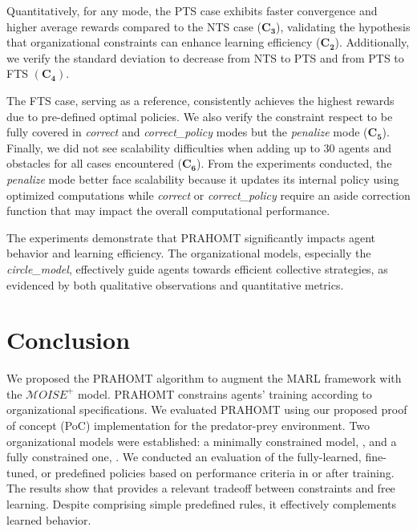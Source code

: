 \documentclass[runningheads]{llncs}
\theoremstyle{freethm}
\theoremstyle{proofoutline}
\newcounter{proof}
\begin{document}
Quantitatively, for any mode, the PTS case exhibits faster convergence and higher average rewards compared to the NTS case ($\mathbf{C_3}$), validating the hypothesis that organizational constraints can enhance learning efficiency ($\mathbf{C_2}$). Additionally, we verify the standard deviation to decrease from NTS to PTS and from PTS to FTS $(\mathbf{C_4})$.

The FTS case, serving as a reference, consistently achieves the highest rewards due to pre-defined optimal policies. We also verify the constraint respect to be fully covered in \textit{correct} and \textit{correct\_policy} modes but the \textit{penalize} mode ($\mathbf{C_5}$). Finally, we did not see scalability difficulties when adding up to 30 agents and obstacles for all cases encountered ($\mathbf{C_6}$). From the experiments conducted, the \textit{penalize} mode better face scalability because it updates its internal policy using optimized computations while \textit{correct} or \textit{correct\_policy} require an aside correction function that may impact the overall computational performance.

The experiments demonstrate that PRAHOMT significantly impacts agent behavior and learning efficiency. The organizational models, especially the \textit{circle\_model}, effectively guide agents towards efficient collective strategies, as evidenced by both qualitative observations and quantitative metrics.


\section{Conclusion}\label{sec:conclusion}

We proposed the PRAHOMT algorithm to augment the MARL framework with the $\mathcal{M}OISE^+$ model. PRAHOMT constrains agents' training according to organizational specifications. We evaluated PRAHOMT using our proposed proof of concept (PoC) implementation for the  predator-prey environment. Two organizational models were established: a minimally constrained model, , and a fully constrained one, . We conducted an evaluation of the fully-learned, fine-tuned, or predefined policies based on performance criteria in or after training.
%
The results show that  provides a relevant tradeoff between constraints and free learning. Despite comprising simple predefined rules, it effectively complements learned behavior.
\end{document}
